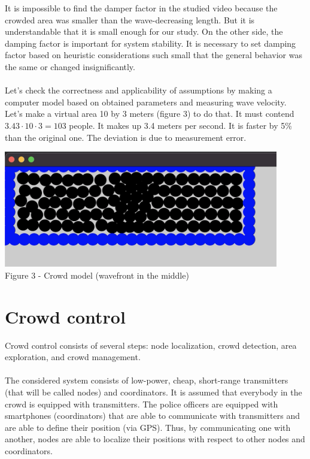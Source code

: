 \documentclass[12pt,a4paper]{report}
\begin{document}
It is impossible to find the damper factor in the studied video because the crowded area was smaller than the wave-decreasing length. But it is understandable that it is small enough for our study. On the other side, the damping factor is important for system stability. It is necessary to set damping factor based on heuristic considerations such small that the general behavior was the same or changed insignificantly.\\\\
Let's check the correctness and applicability of assumptions by making a computer model based on obtained parameters and measuring wave velocity.
Let's make a virtual area 10 by 3 meters (figure 3) to do that. It must contend $3.43\cdot10\cdot3=103$ people. It makes up 3.4 meters per second. It is faster by 5\% than the original one. The deviation is due to measurement error.
\begin{center}
    \includegraphics[width=12cm]{img/Wave.png}\\
    Figure 3 - Crowd model (wavefront in the middle)
\end{center}
\chapter*{Crowd control}
Crowd control consists of several steps: node localization, crowd detection, area exploration, and crowd management. \\\\
The considered system consists of low-power, cheap, short-range transmitters (that will be called nodes) and coordinators. It is assumed that everybody in the crowd is equipped with transmitters. The police officers are equipped with smartphones (coordinators) that are able to communicate with transmitters and are able to define their position (via GPS). 
Thus, by communicating one with another, nodes are able to localize their positions with respect to other nodes and coordinators.
\end{document}
